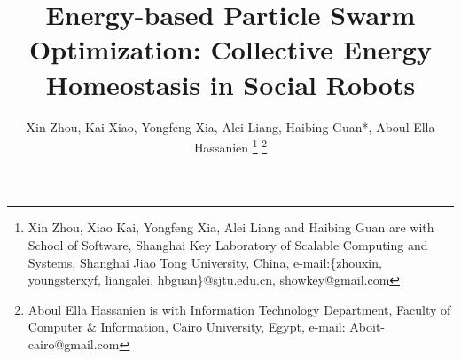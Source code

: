 \documentclass[journal]{IEEEtran}
\begin{document}
%
\title{Energy-based Particle Swarm Optimization: Collective Energy Homeostasis in Social Robots}
%
%
%

\author{Xin Zhou,
        Kai Xiao,
		Yongfeng Xia,
		Alei Liang,
		Haibing Guan*,
		Aboul Ella Hassanien%
\thanks{Xin Zhou, Xiao Kai, Yongfeng Xia, Alei Liang and Haibing Guan are with School of Software, Shanghai Key Laboratory of Scalable Computing and Systems, Shanghai Jiao Tong University, China, e-mail:\{zhouxin, youngsterxyf, liangalei, hbguan\}@sjtu.edu.cn, showkey@gmail.com}
\thanks{Aboul Ella Hassanien is with Information Technology Department, Faculty of Computer \& Information, Cairo University, Egypt, e-mail: Aboit-cairo@gmail.com}
}
% 
%
\end{document}
